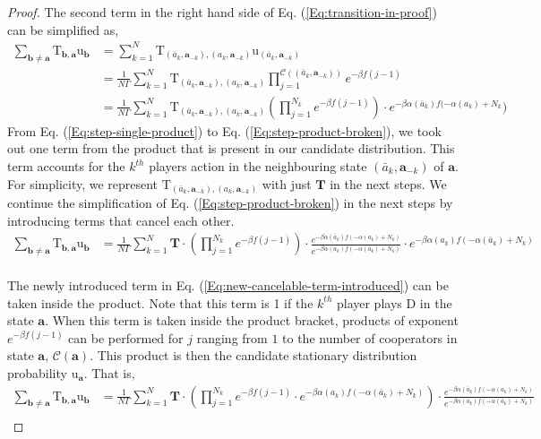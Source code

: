 \documentclass[11pt]{article}
\theoremstyle{plainCl1}
\theoremstyle{plainCl2}
\newcommand{\abf}{\mathbf{a}}
\newcommand{\bbf}{\mathbf{b}}
\newcommand{\T}{\mathbf{T}}
\newcommand{\D}{\mathrm{D}}
\begin{document}
\begin{proof}
The second term in the right hand side of Eq. (\ref{Eq:transition-in-proof}) can be simplified as, 
\begin{align}
\sum_{\bbf \neq \abf} \mathrm{T}_{\bbf, \abf} \mathrm{u}_{\bbf} &= \sum_{k=1}^N \mathrm{T}_{(\bar{a}_k, \abf_{-k}),(a_k, \abf_{-k})} \mathrm{u}_{(\bar{a}_k, \abf_{-k})} \\[10pt]
\label{Eq:step-single-product}
&= \frac{1}{N \Gamma} \sum_{k=1}^N \mathrm{T}_{(\bar{a}_k, \abf_{-k}),(a_k, \abf_{-k})} \displaystyle \prod_{j=1}^{\mathcal{C}((\bar{a}_k, \abf_{-k}))} e^{-\beta f(j-1)}\\[10pt]
&=  \frac{1}{N \Gamma} \sum_{k=1}^N \mathrm{T}_{(\bar{a}_k, \abf_{-k}),(a_k, \abf_{-k})} \displaystyle \left( \prod_{j=1}^{N_k}  e^{-\beta f(j-1)} \right) \cdot e^{-\beta \alpha(\bar{a}_k)f(-\alpha(a_k)+ N_k})
\label{Eq:step-product-broken}
\end{align}
From Eq. (\ref{Eq:step-single-product}) to Eq. (\ref{Eq:step-product-broken}), we took out one term from the product that is present in our candidate distribution. This term accounts for the $k^{th}$ players action in the neighbouring state $(\bar{a}_k, \abf_{-k})$ of $\abf$. For simplicity, we represent $\mathrm{T}_{(\bar{a}_k, \abf_{-k}),(a_k, \abf_{-k})}$ with just $\T$ in the next steps. We continue the simplification of Eq. (\ref{Eq:step-product-broken}) in the next steps by introducing terms that cancel each other. \\[10pt]
\begin{align}
\sum_{\bbf \neq \abf} \mathrm{T}_{\bbf, \abf} \mathrm{u}_{\bbf} &=  \frac{1}{N \Gamma} \sum_{k=1}^N \T \cdot \displaystyle \left( \prod_{j=1}^{N_k}  e^{-\beta f(j-1)} \right) \cdot \frac{e^{-\beta \alpha(\bar{a}_k)f(-\alpha(a_k)+ N_k)}}{e^{-\beta \alpha(a_k)f(-\alpha(\bar{a}_k) +N_k)}} \cdot e^{-\beta \alpha(a_k)f(-\alpha(\bar{a}_k) + N_k)}
\label{Eq:new-cancelable-term-introduced}
\end{align}
\\ \noindent The newly introduced term in Eq. (\ref{Eq:new-cancelable-term-introduced}) can be taken inside the product. Note that this term is 1 if the $k^{th}$ player plays $\D$ in the state $\abf$. When this term is taken inside the product bracket, products of exponent $e^{-\beta f(j-1)}$ can be performed for $j$ ranging from $1$ to the number of cooperators in state $\abf$, $\mathcal{C}(\abf)$. This product is then the candidate stationary distribution probability $\mathrm{u}_\abf$. That is, 
\begin{align}
\sum_{\bbf \neq \abf} \mathrm{T}_{\bbf, \abf} \mathrm{u}_{\bbf} &=  \frac{1}{N \Gamma} \sum_{k=1}^N \T \cdot \displaystyle \left( \prod_{j=1}^{N_k}  e^{-\beta f(j-1)} \cdot e^{-\beta \alpha(a_k)f(-\alpha(\bar{a}_k) + N_k)} \right) \cdot \frac{e^{-\beta \alpha(\bar{a}_k)f(-\alpha(a_k)+ N_k)}}{e^{-\beta \alpha(a_k)f(-\alpha(\bar{a}_k) +N_k)}} \\[10pt]

\end{align}
\end{proof}
\end{document}
